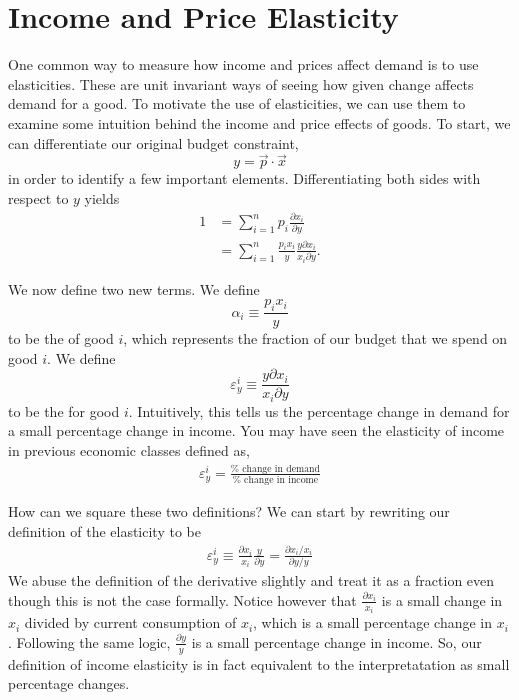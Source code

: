 \section{Income and Price Elasticity}
One common way to measure how income and prices affect demand is to use elasticities. These are unit invariant ways of seeing how given change affects demand for a good. To motivate the use of elasticities, we can use them to examine some intuition behind the income and price effects of goods. To start, we can differentiate our original budget constraint, 
$$y = \vec{p} \cdot \vec{x}$$
in order to identify a few important elements. Differentiating both sides with respect to $y$ yields\
\begin{align*}
    1 &=\sum_{i=1}^{n} p_{i} \frac{\partial x_{i}}{\partial y} \\
    &= \sum_{i=1}^{n} \frac{p_{i} x_{i}}{y} \frac{y \partial x_{i}}{x_{i} \partial y}.
\end{align*}


We now define two new terms. We define 
$$\alpha_i \equiv \frac{p_{i} x_{i}}{y}$$
to be the  of good $i$, which represents the fraction of our budget that we spend on good $i$. We define 
$$\varepsilon_y^i \equiv \frac{y \partial x_{i}}{x_{i} \partial y}$$
to be the \vocab{income elasticity of demand} for good $i$. Intuitively, this tells us the percentage change in demand for a small percentage change in income. You may have seen the elasticity of income in previous economic classes defined as,
\begin{align*}
    \varepsilon_y^i = \frac{\% \text{ change in demand}}{\% \text{ change in income}}
\end{align*}

How can we square these two definitions? We can start by rewriting our definition of the elasticity to be
\begin{align*}
    \varepsilon_y^i \equiv \frac{\partial x_i}{x_i}  \frac{y}{\partial y} = \frac{\partial x_i / x_i}{\partial y / y}
\end{align*}
We abuse the definition of the derivative slightly and treat it as a fraction even though this is not the case formally. Notice however that $\frac{\partial x_i}{x_i}$ is a small change in $x_i$ divided by current consumption of $x_i$, which is a small percentage change in $x_i$. Following the same logic, $\frac{\partial y}{y}$ is a small percentage change in income. So, our definition of income elasticity is in fact equivalent to the interpretatation as small percentage changes.

